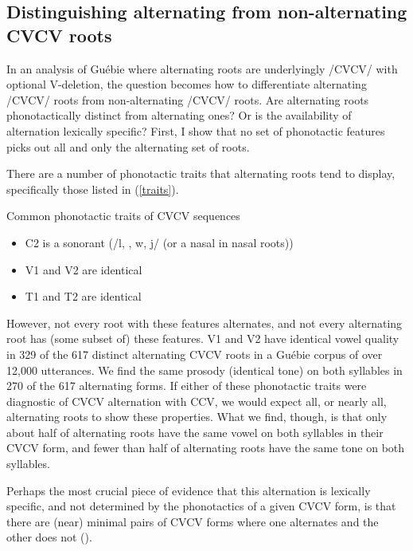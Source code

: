 \documentclass[output=paper,colorlinks,citecolor=brown]{langscibook}
\begin{document}
\subsection{Distinguishing alternating from non-alternating CVCV roots}

In an analysis of Guébie where alternating roots are underlyingly /CVCV/ with optional V-deletion, the question becomes how to differentiate alternating /CVCV/ roots from non-alternating /CVCV/ roots. Are alternating roots phonotactically distinct from alternating ones? Or is the availability of alternation lexically specific? First, I show that no set of phonotactic features picks out all and only the alternating set of roots.

There are a number of phonotactic traits that alternating roots tend to display, specifically those listed in (\ref{traits}).%
 
\ea Common phonotactic traits of CVCV sequences\label{traits}
\begin{itemize}
	\item C2 is a sonorant (/l, , w, j/ (or a nasal in nasal roots))
	\item V1 and V2 are identical
	\item T1 and T2 are identical
\end{itemize}
\z 

\noindent However, not every root with these features alternates, and not every alternating root has (some subset of) these features. V1 and V2 have identical vowel quality in 329 of the 617 distinct alternating CVCV roots in a Guébie corpus of over 12,000 utterances. We find the same prosody (identical tone) on both syllables in 270 of the 617 alternating forms. If either of these phonotactic traits were diagnostic of CVCV alternation with CCV, we would expect all, or nearly all, alternating roots to show these properties. What we find, though, is that only about half of alternating roots have the same vowel on both syllables in their CVCV form, and fewer than half of alternating roots have the same tone on both syllables.

Perhaps the most crucial piece of evidence that this alternation is lexically specific, and not determined by the phonotactics of a given CVCV form, is that there are (near) minimal pairs of CVCV forms where one alternates and the other does not ().
\end{document}
